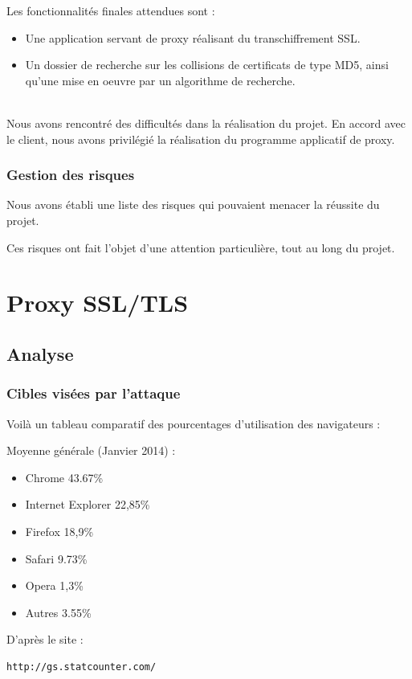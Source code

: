 \documentclass[a4paper,11pt,french]{report}
\begin{document}
Les fonctionnalités finales attendues sont :
\begin{itemize}
\item Une application servant de proxy réalisant du transchiffrement SSL.
\item Un dossier de recherche sur les collisions de certificats de type MD5, ainsi qu'une mise en oeuvre 
par un algorithme de recherche.
\end{itemize}
~~\\

Nous avons rencontré des difficultés dans la réalisation du projet.
En accord avec le client, nous avons privilégié la réalisation du programme applicatif de proxy.

\subsection{Gestion des risques}

Nous avons établi une liste des risques qui pouvaient menacer la réussite du projet.

Ces risques ont fait l'objet d'une attention particulière, tout au long du projet.

\chapter{Proxy SSL/TLS}
\section{Analyse}

\subsection{Cibles visées par l'attaque}
Voilà un tableau comparatif des pourcentages d'utilisation des navigateurs : 

Moyenne générale (Janvier 2014) :
\begin{itemize}
\item{Chrome} 		43.67\%
\item{Internet Explorer}		 22,85\%
\item{Firefox} 		18,9\%
\item{Safari} 		9.73\%
\item{Opera}	 		1,3\%	
\item{Autres} 		3.55\%
\end{itemize}	


D'après le site : \begin{verbatim}
http://gs.statcounter.com/
\end{verbatim}
\end{document}
